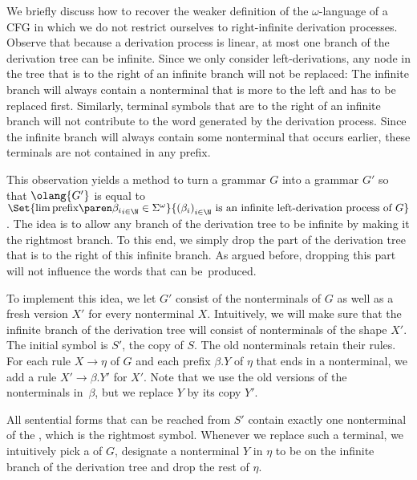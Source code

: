 \documentclass[../../diss.tex]{subfiles}
\begin{document}
\begin{remark}%
\label{Remark:OmegaCFGWeakerDefinition}%
    We briefly discuss how to recover the weaker definition of the $\omega$-language of a CFG in which we do not restrict ourselves to right-infinite derivation processes.
    Observe that because a derivation process is linear, at most one branch of the derivation tree can be infinite.
    Since we only consider left-derivations, any node in the tree that is to the right of an infinite branch will not be replaced:
    The infinite branch will always contain a nonterminal that is more to the left and has to be replaced first.
    Similarly, terminal symbols that are to the right of an infinite branch will not contribute to the word generated by the derivation process.
    Since the infinite branch will always contain some nonterminal that occurs earlier, these terminals are not contained in any prefix.

    This observation yields a method to turn a grammar $G$ into a grammar $G'$ so that $\olang{G'}$ is equal to $\Set{ \lim \tprefix{\beta_i}_{i \in \N} \in \Sigma^\omega }{ {(\beta_i)}_{i \in \N} \text{ is an infinite left-derivation process of } G}$.
    The idea is to allow any branch of the derivation tree to be infinite by making it the rightmost branch.
    To this end, we simply drop the part of the derivation tree that is to the right of this infinite branch.
    As argued before, dropping this part will not influence the words that can be~produced.

    To implement this idea, we let $G'$ consist of the nonterminals of $G$ as well as a fresh version $X'$ for every nonterminal $X$.
    Intuitively, we will make sure that the infinite branch of the derivation tree will consist of nonterminals of the shape $X'$.
    The initial symbol is $S'$, the copy of $S$.
    The old nonterminals retain their rules.
    For each rule $X \to \eta$ of $G$ and each prefix $\beta.Y$ of $\eta$ that ends in a nonterminal, we add a rule $X' \to \beta.Y'$ for $X'$.
    Note that we use the old versions of the nonterminals in~$\beta$, but we replace $Y$ by its copy $Y'$.

    All sentential forms that can be reached from $S'$ contain exactly one nonterminal of the , which is the rightmost symbol.
    Whenever we replace such a terminal, we intuitively pick a  of $G$, designate a nonterminal $Y$ in $\eta$ to be on the infinite branch of the derivation tree and drop the rest of $\eta$.


\end{remark}
\end{document}
